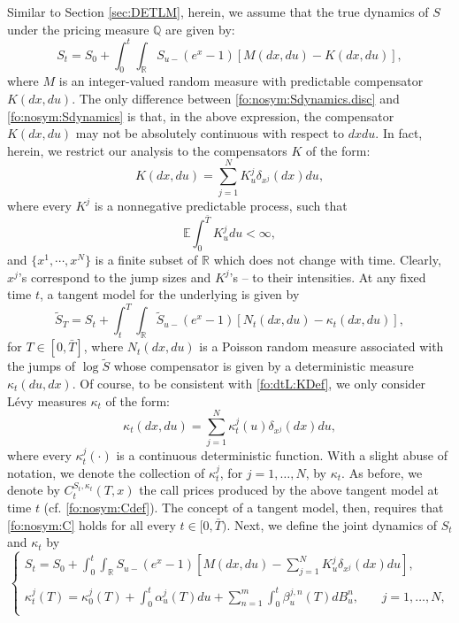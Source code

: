 \documentclass{article}
\numberwithin{equation}{section}
\newcommand\EE {\mathbb E}
\newcommand\RR {\mathbb R}
\newcommand\QQ {\mathbb Q}
\def\bT{\bar{T}}
\begin{document}
Similar to Section \ref{sec:DETLM}, herein, we assume that the true dynamics of $S$ under the pricing measure $\QQ$ are given by:
\begin{equation}
\label{fo:nosym:Sdynamics.disc}
S_t = S_0 + \int_0^t \int_{\RR} S_{u-}(e^x-1)[M(dx,du)-K(dx,du)],
\end{equation}
where $M$ is an integer-valued random measure with predictable compensator $K(dx,du)$. The only difference between \eqref{fo:nosym:Sdynamics.disc} and \eqref{fo:nosym:Sdynamics} is that, in the above expression, the compensator $K(dx,du)$ may not be absolutely continuous with respect to $dxdu$. In fact, herein, we restrict our analysis to the compensators $K$ of the form:
\begin{equation}\label{fo:dtL:KDef}
K(dx,du) = \sum_{j=1}^N K_u^j \delta_{x^j}(dx)du,
\end{equation}
where every $K^j$ is a nonnegative predictable process, such that
$$
\EE \int_0^{\bT} K^j_u du < \infty,
$$
and $\{x^1,\cdots,x^N\}$ is a finite subset of $\RR$ which does not change with time. Clearly, $x^j$'s correspond to the jump sizes and $K^j$'s -- to their intensities.
At any fixed time $t$, a tangent model for the underlying is given by
\begin{equation}
\label{fo:disc.tangent.proc.def}
\tilde{S}_T = S_t + \int_t^T \int_{\RR} \tilde{S}_{u-}(e^x-1)\left[N_t(dx,du)-\kappa_t(dx,du)\right],
\end{equation}
for $T\in[0,\bar{T}]$, where $N_t(dx,du)$ is a Poisson random measure associated with the jumps of $\log \tilde{S}$ whose compensator is given by a deterministic measure $\kappa_t(du,dx)$. 
Of course, to be consistent with \eqref{fo:dtL:KDef}, we only consider L\'evy measures $\kappa_t$ of the form:
\begin{equation}\label{fo:dtL:kappaDef}
\kappa_t(dx,du) = \sum_{j=1}^N\kappa_t^j(u) \delta_{x^j}(dx)du,
\end{equation}
where every $\kappa^j_t(\cdot)$ is a continuous deterministic function. With a slight abuse of notation, we denote the collection of $\kappa^j_t$, for $j=1,\ldots,N$, by $\kappa_t$. As before, we denote by $C_t^{S_t, \kappa_t}(T,x)$ the call prices produced by the above tangent model at time $t$ (cf. \eqref{fo:nosym:Cdef}). The concept of a tangent model, then, requires that \eqref{fo:nosym:C} holds for all every $t \in [0, \bar{T})$.
Next, we define the joint dynamics of $S_t$ and $\kappa_t$ by
\begin{equation}\label{fo:dtl:dyn}
\left\{
\begin{array}{c}
{ S_t = S_0 + \int_0^t \int_{\RR}S_{u-}(e^x-1)\left[M(dx,du)-\sum_{j=1}^N K_u^j \delta_{x^j}(dx)du\right],}\\
{}\\
{\kappa^j_t(T) = \kappa^j_0(T) + \int_0^{t}\alpha^j_u(T) du + \sum_{n=1}^m \int_0^{t} \beta^{j,n}_u(T) dB^n_u,
\,\,\,\,\,\,\,\,\,\,\,j=1,\ldots,N,}\\
\end{array}
\right.
\end{equation}
\end{document}
